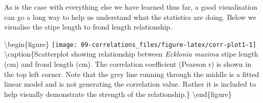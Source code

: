 \documentclass[english,10pt,a4paper,oneside]{book}
\newenvironment{Shaded}{\begin{snugshade}}{\end{snugshade}}
\newcommand{\CommentTok}[1]{\textcolor[rgb]{0.56,0.35,0.01}{\textit{#1}}}
\newcommand{\DataTypeTok}[1]{\textcolor[rgb]{0.13,0.29,0.53}{#1}}
\newcommand{\DecValTok}[1]{\textcolor[rgb]{0.00,0.00,0.81}{#1}}
\newcommand{\KeywordTok}[1]{\textcolor[rgb]{0.13,0.29,0.53}{\textbf{#1}}}
\newcommand{\NormalTok}[1]{#1}
\newcommand{\OperatorTok}[1]{\textcolor[rgb]{0.81,0.36,0.00}{\textbf{#1}}}
\newcommand{\StringTok}[1]{\textcolor[rgb]{0.31,0.60,0.02}{#1}}
\theoremstyle{definition}
\theoremstyle{definition}
\theoremstyle{definition}
\theoremstyle{remark}
\begin{document}
As is the case with everything else we have learned thus far, a good
visualisation can go a long way to help us understand what the
statistics are doing. Below we visualise the stipe length to frond
length relationship.

\begin{Shaded}
\end{Shaded}

\textbackslash{}begin\{figure\}
\texttt{[image: 09-correlations\_files/figure-latex/corr-plot1-1]}
\textbackslash{}caption\{Scatterplot showing relationship between
\emph{Ecklonia maxima} stipe length (cm) and frond length (cm). The
correlation coefficient (Pearson r) is shown in the top left corner.
Note that the grey line running through the middle is a fitted linear
model and is not generating the correlation value. Rather it is included
to help visually demonstrate the strength of the
relationship.\}\label{fig:corr-plot1} \textbackslash{}end\{figure\}
\end{document}
